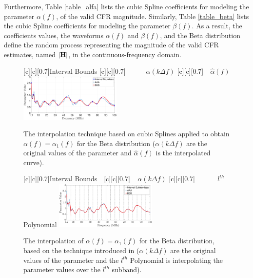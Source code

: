 \documentclass[journal]{IEEEtran}
\begin{document}
Furthermore, Table \ref{table_alfa} lists the cubic Spline coefficients for modeling the parameter $\alpha(f)$, of the valid \ac{CFR} magnitude. Similarly, Table \ref{table_beta} lists the cubic Spline coefficients for modeling the parameter $\beta(f)$. As a result, the coefficients values, the waveforms  $\alpha(f)$ and $\beta(f)$, and the Beta distribution define the random process representing the magnitude of the valid \ac{CFR} estimates, named $|{\bf H}|$, in the continuous-frequency domain.

\begin{figure}[h]
	\centering
	[c][0.7]{Interval Bounds}
	[c][0.7]{~~~~~~$\alpha(k \Delta f)$}
	[c][0.7]{~~$\hat{\alpha}(f)$}
	\includegraphics[width=0.45\textwidth]{images/Alfa_fit_1.7.eps}
	\caption{The interpolation technique based on cubic Splines applied to obtain $\alpha(f) = \alpha_1(f)$ for the Beta distribution ($\alpha(k \Delta f)$ are the original values of the parameter and $\hat{\alpha}(f)$ is the interpolated curve).}
	\label{Fit_alfa}
\end{figure}

\begin{figure}[h]
	\centering
	[c][0.7]{Interval Bounds$~~~$}
	[c][0.7]{$~~~~~{\alpha}(k \Delta f)$}
	[c][0.7]{$~~~~~~~~~~~~~~~l^{th}$ Polynomial}
	\includegraphics[width=0.45\textwidth]{images/SPLINE_Polynomials.eps}
	\caption{The interpolation of $\alpha(f)=\alpha_1(f)$ for the Beta distribution, based on the technique introduced in \cite{Luis:AI} (${\alpha}(k \Delta f)$ are the original values of the parameter and the $l^{th}$ Polynomial is interpolating the parameter values over the $l^{th}$ subband).}
	\label{Fit_alfa_poli}
\end{figure}
\end{document}
